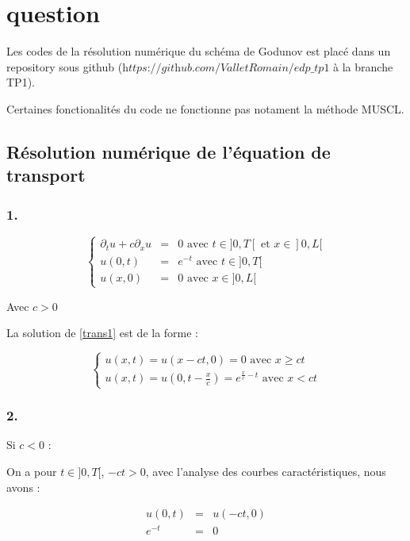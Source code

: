 \documentclass{article}
\begin{document}
\section{question}

Les codes de la résolution numérique du schéma de Godunov est placé dans un repository sous github ($\textit{https://github.com/ValletRomain/edp\_tp1}$ à la branche TP1).

Certaines fonctionalités du code ne fonctionne pas notament la méthode MUSCL.

\subsection{Résolution numérique de l’équation de transport}

\subsubsection*{1.}

\[ \left\{ \begin{matrix}
\partial_t u + c \partial_x u &=& 0 \text{ avec } t \in ]0,T[ \text{ et } x \in ]0,L[  \\
u(0,t) &=& e^{-t} \text{ avec } t \in ]0,T[ \\
u(x,0) &=& 0 \text{ avec } x \in ]0,L[
\end{matrix} \right.
\label{trans1} \tag{Transport1} \]

Avec $c>0$
\newline

La solution de \ref{trans1} est de la forme :

\[
\left\{
\begin{array}{ll}
    u(x,t) = u(x-ct,0) = 0 \text{ avec } x \geq ct \\
    u(x,t) = u(0,t-\frac{x}{c}) = e^{\frac{x}{c}-t} \text{ avec } x < ct
\end{array}
\right.
\tag{Sol1}
\]

\subsubsection*{2.}

Si $c < 0$ :

On a pour $t \in ]0,T[$, $-ct>0$, avec l'analyse des courbes caractéristiques, nous avons :

\begin{eqnarray*}
u(0,t) &=& u(-ct,0) \\
e^{-t} &=& 0
\end{eqnarray*}
\end{document}
